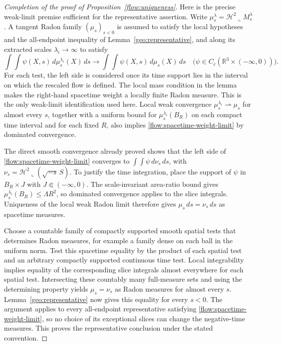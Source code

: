 \begin{proof}[Completion of the proof of Proposition~\ref{flow:uniqueness}]
Here is the precise weak-limit premise sufficient for the representative
assertion.  Write
$\mu_s^\lambda=\mathcal H^2\!\llcorner M_s^\lambda$.  A tangent
Radon family $(\mu_s)_{s<0}$ is assumed to satisfy the local hypotheses
and the all-endpoint inequality of Lemma~\ref{geo:representative}, and
along its extracted scales $\lambda_i\to\infty$ to satisfy
\begin{equation}\label{flow:spacetime-weight-limit}
 \int\!\!\int\psi(X,s)\,d\mu_s^{\lambda_i}(X)\,ds
 \longrightarrow
 \int\!\!\int\psi(X,s)\,d\mu_s(X)\,ds
 \quad\bigl(\psi\in C_c(\mathbb R^3\times(-\infty,0))\bigr).
\end{equation}
For each test, the left side is considered once its time support lies
in the interval on which the rescaled flow is defined.
The local mass condition in the lemma makes the right-hand spacetime
weight a locally finite Radon measure.  This is the only weak-limit
identification used here.  Local weak convergence
$\mu_s^{\lambda_i}\rightharpoonup\mu_s$ for almost every $s$, together
with a uniform bound for $\mu_s^{\lambda_i}(B_R)$ on each compact time
interval and for each fixed $R$, also implies
\eqref{flow:spacetime-weight-limit} by dominated convergence.

The direct smooth convergence already proved shows that the left side
of \eqref{flow:spacetime-weight-limit} converges to
$\int\!\!\int\psi\,d\nu_s\,ds$, with
$\nu_s=\mathcal H^2\!\llcorner(\sqrt{-s}\,S)$.  To justify the time
integration, place the support of $\psi$ in $B_R\times J$ with
$J\Subset(-\infty,0)$.  The scale-invariant area-ratio bound gives
$\mu_s^{\lambda_i}(B_R)\le\Lambda R^2$, so dominated convergence
applies to the slice integrals.  Uniqueness of the local weak Radon
limit therefore gives
$\mu_s\,ds=\nu_s\,ds$ as spacetime measures.

Choose a countable family of compactly supported smooth spatial tests
that determines Radon measures, for example a family dense on each
ball in the uniform norm.  Test this spacetime equality by the product
of each spatial test and an arbitrary compactly supported continuous
time test.  Local integrability implies equality of the corresponding
slice integrals almost everywhere for each spatial test.  Intersecting
these countably many full-measure sets and using the determining
property yields $\mu_s=\nu_s$ as Radon measures for almost every $s$.
Lemma~\ref{geo:representative} now gives this equality for every
$s<0$.  The argument applies to every all-endpoint representative
satisfying \eqref{flow:spacetime-weight-limit}, so no choice of its
exceptional slices can change the negative-time measures.  This
proves the representative conclusion under the stated convention.
\end{proof}

